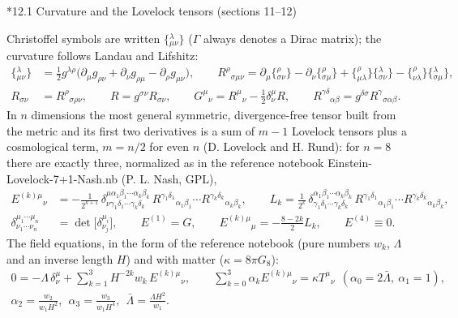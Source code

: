 \documentclass[10pt,a4paper]{article}
\makeatletter
\renewcommand\subsection{\@startsection{subsection}{2}{\z@}{-3.25ex\@plus -1ex \@minus -.2ex}{1.5ex \@plus .2ex}{\normalfont\large\bfseries\raggedright}}
\makeatother
\begin{document}
\subsection*{12.1 Curvature and the Lovelock tensors (sections 11–12)}
Christoffel symbols are written $\{{}^{\lambda}_{\mu\nu}\}$ ($\Gamma$ always denotes a Dirac matrix); the curvature follows Landau and Lifshitz:
\begin{align*}
\{{}^{\lambda}_{\mu\nu}\}&=\tfrac12g^{\lambda\rho}\big(\partial_\mu g_{\rho\nu}+\partial_\nu g_{\rho\mu}-\partial_\rho g_{\mu\nu}\big),\qquad R^{\rho}{}_{\sigma\mu\nu}=\partial_\mu\{{}^{\rho}_{\sigma\nu}\}-\partial_\nu\{{}^{\rho}_{\sigma\mu}\}+\{{}^{\rho}_{\mu\lambda}\}\{{}^{\lambda}_{\sigma\nu}\}-\{{}^{\rho}_{\nu\lambda}\}\{{}^{\lambda}_{\sigma\mu}\}, \\
R_{\sigma\nu}&=R^{\rho}{}_{\sigma\rho\nu},\qquad R=g^{\sigma\nu}R_{\sigma\nu},\qquad G^\mu{}_\nu=R^\mu{}_\nu-\tfrac12\delta^\mu_\nu R,\qquad R^{\gamma\delta}{}_{\alpha\beta}=g^{\delta\sigma}R^{\gamma}{}_{\sigma\alpha\beta}.
\end{align*}
In $n$ dimensions the most general symmetric, divergence-free tensor built from the metric and its first two derivatives is a sum of $m-1$ Lovelock tensors plus a cosmological term, $m=n/2$ for even $n$ (D. Lovelock and H. Rund): for $n=8$ there are exactly three, normalized as in the reference notebook Einstein-Lovelock-7+1-Nash.nb (P. L. Nash, GPL),
\begin{align*}
E^{(k)\mu}{}_\nu&=-\frac{1}{2^{k+1}}\,\delta^{\mu\alpha_1\beta_1\cdots\alpha_k\beta_k}_{\nu\gamma_1\delta_1\cdots\gamma_k\delta_k}\,R^{\gamma_1\delta_1}{}_{\alpha_1\beta_1}\cdots R^{\gamma_k\delta_k}{}_{\alpha_k\beta_k},\qquad L_k=\frac{1}{2^k}\,\delta^{\alpha_1\beta_1\cdots\alpha_k\beta_k}_{\gamma_1\delta_1\cdots\gamma_k\delta_k}\,R^{\gamma_1\delta_1}{}_{\alpha_1\beta_1}\cdots R^{\gamma_k\delta_k}{}_{\alpha_k\beta_k}, \\
\delta^{\mu_1\cdots\mu_n}_{\nu_1\cdots\nu_n}&=\det\big[\delta^{\mu_i}_{\nu_j}\big],\qquad E^{(1)}=G,\qquad E^{(k)\mu}{}_\mu=-\frac{8-2k}{2}L_k,\qquad E^{(4)}\equiv0 .
\end{align*}
The field equations, in the form of the reference notebook (pure numbers $w_k$, $\Lambda$ and an inverse length $H$) and with matter ($\kappa=8\pi G_8$):
\begin{gather*}
0=-\Lambda\,\delta^\mu_\nu+\sum_{k=1}^{3}H^{-2k}w_k\,E^{(k)\mu}{}_\nu,\qquad \sum_{k=0}^{3}\alpha_kE^{(k)\mu}{}_\nu=\kappa T^\mu{}_\nu\ \ (\alpha_0=2\bar\Lambda,\ \alpha_1=1),\\ \alpha_2=\frac{w_2}{w_1H^2},\ \ \alpha_3=\frac{w_3}{w_1H^4},\ \ \bar\Lambda=\frac{\Lambda H^2}{w_1}.
\end{gather*}
\end{document}
